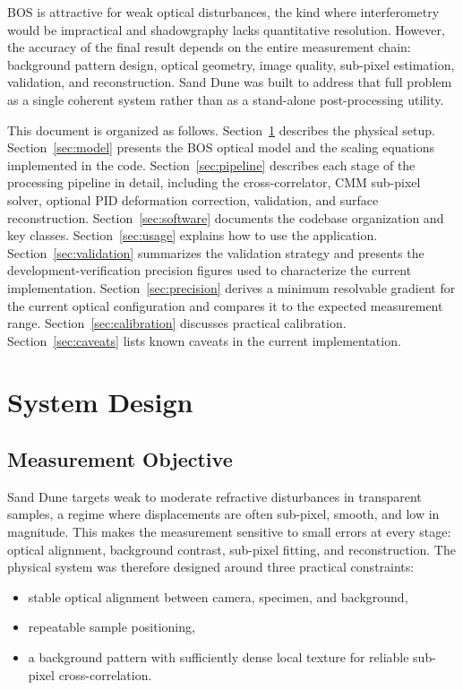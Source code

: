 \documentclass[11pt]{article}
\begin{document}
BOS is attractive for weak optical disturbances, the kind where
interferometry would be impractical and shadowgraphy lacks quantitative
resolution. However, the accuracy of the final result depends on the entire
measurement chain: background pattern design, optical geometry, image quality,
sub-pixel estimation, validation, and reconstruction. Sand Dune was built to
address that full problem as a single coherent system rather than as a
stand-alone post-processing utility.

This document is organized as follows.
Section~\ref{sec:system} describes the physical setup.
Section~\ref{sec:model} presents the BOS optical model and the scaling
equations implemented in the code.
Section~\ref{sec:pipeline} describes each stage of the processing pipeline in
detail, including the cross-correlator, CMM sub-pixel solver, optional PID
deformation correction, validation, and surface reconstruction.
Section~\ref{sec:software} documents the codebase organization and key classes.
Section~\ref{sec:usage} explains how to use the application.
Section~\ref{sec:validation} summarizes the validation strategy and presents
the development-verification precision figures used to characterize the
current implementation.
Section~\ref{sec:precision} derives a minimum resolvable gradient for
the current optical configuration and compares it to the expected
measurement range.
Section~\ref{sec:calibration} discusses practical calibration.
Section~\ref{sec:caveats} lists known caveats in the current implementation.

\section{System Design}
\label{sec:system}

\subsection{Measurement Objective}

Sand Dune targets weak to moderate refractive disturbances in transparent
samples, a regime where displacements are often sub-pixel, smooth, and
low in magnitude. This makes the measurement sensitive to small errors at
every stage: optical alignment, background contrast, sub-pixel fitting, and
reconstruction. The physical system was therefore designed around three
practical constraints:

\begin{itemize}[noitemsep]
  \item stable optical alignment between camera, specimen, and background,
  \item repeatable sample positioning,
  \item a background pattern with sufficiently dense local texture for
        reliable sub-pixel cross-correlation.
\end{itemize}
\end{document}
